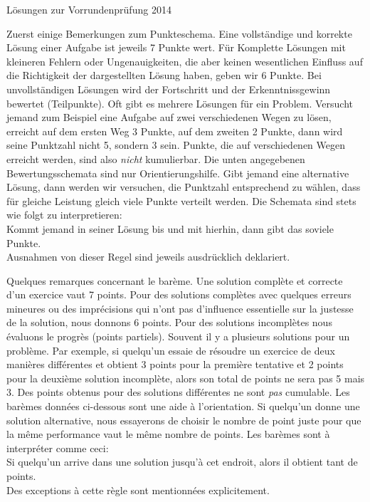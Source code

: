 \documentclass[12pt,a4paper]{article}
\theoremstyle{plain}
\theoremstyle{definition}
\theoremstyle{remark}
\begin{document}
\pagestyle{empty}

\begin{center}
{\huge Lösungen zur Vorrundenprüfung 2014} \\
\end{center}
\vspace{8mm}

Zuerst einige Bemerkungen zum Punkteschema. Eine vollständige und korrekte Lösung einer Aufgabe ist jeweils 7 Punkte wert. Für Komplette Lösungen mit kleineren Fehlern oder Ungenauigkeiten, die aber keinen wesentlichen Einfluss auf die Richtigkeit der dargestellten Lösung haben, geben wir 6 Punkte. Bei unvollständigen Lösungen wird der Fortschritt und der Erkenntnissgewinn bewertet (Teilpunkte). Oft gibt es mehrere Lösungen für ein Problem. Versucht jemand zum Beispiel eine Aufgabe auf zwei verschiedenen Wegen zu lösen, erreicht auf dem ersten Weg 3 Punkte, auf dem zweiten 2 Punkte, dann wird seine Punktzahl nicht 5, sondern 3 sein. Punkte, die auf verschiedenen Wegen erreicht werden, sind also \emph{nicht} kumulierbar. Die unten angegebenen Bewertungsschemata sind nur Orientierungshilfe. Gibt jemand eine alternative Lösung, dann werden wir versuchen, die Punktzahl entsprechend zu wählen, dass für gleiche Leistung gleich viele Punkte verteilt werden. Die Schemata sind stets wie folgt zu interpretieren:\\
Kommt jemand in seiner Lösung bis und mit hierhin, dann gibt das soviele Punkte.\\ 
Ausnahmen von dieser Regel sind jeweils ausdrücklich deklariert.

\vspace{8mm}

Quelques remarques concernant le barème. Une solution complète et correcte d'un exercice vaut 7 points. Pour des solutions complètes avec quelques erreurs mineures ou des imprécisions qui n'ont pas d'influence essentielle sur la justesse de la solution, nous donnons 6 points. Pour des solutions incomplètes nous évaluons le progrès (points partiels). Souvent il y a plusieurs solutions pour un problème. Par exemple, si quelqu'un essaie de résoudre un exercice de deux manières différentes et obtient 3 points pour la première tentative et 2 points pour la deuxième solution incomplète, alors son total de points ne sera pas 5 mais 3. Des points obtenus pour des solutions différentes ne sont \emph{pas} cumulable. Les barèmes données ci-dessous sont une aide à l'orientation. Si quelqu'un donne une solution alternative, nous essayerons de choisir le nombre de point juste pour que la même performance vaut le même nombre de points. Les barèmes sont à interpréter comme ceci:\\
Si quelqu'un arrive dans une solution jusqu'à cet endroit, alors il obtient tant de points.\\
Des exceptions à cette règle sont mentionnées explicitement.
\end{document}
